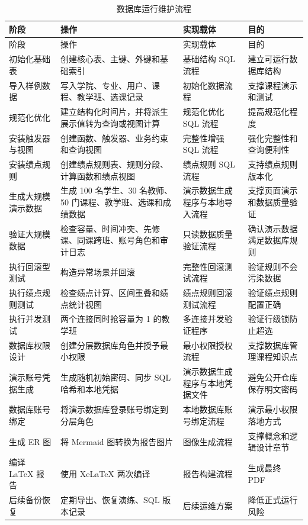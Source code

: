 {\footnotesize
\setlength{\tabcolsep}{3pt}
\renewcommand{\arraystretch}{1.16}
\begin{longtable}{p{}p{}p{}p{}}
\caption{数据库运行维护流程}\label{tab:operation-maintenance-flow}\\
\toprule
阶段 & 操作 & 实现载体 & 目的 \\
\midrule
\endfirsthead
\toprule
阶段 & 操作 & 实现载体 & 目的 \\
\midrule
\endhead
\bottomrule
\endfoot
初始化基础表 & 创建核心表、主键、外键和基础索引 & 基础结构 SQL 流程 & 建立可运行数据库结构 \\
导入样例数据 & 写入学院、专业、用户、课程、教学班、选课记录 & 初始化数据流程 & 支撑课程演示和测试 \\
规范化优化 & 建立结构化时间片，并将派生展示值转为查询或视图计算 & 规范化优化 SQL 流程 & 提高规范化程度 \\
安装触发器与视图 & 创建函数、触发器、业务约束和查询视图 & 完整性增强 SQL 流程 & 强化完整性和查询便利性 \\
安装绩点规则 & 创建绩点规则表、规则分段、计算函数和绩点视图 & 绩点规则 SQL 流程 & 支持绩点规则版本化 \\
生成大规模演示数据 & 生成 100 名学生、30 名教师、50 门课程、教学班、选课和成绩数据 & 演示数据生成程序与本地导入流程 & 支撑页面演示和数据质量验证 \\
验证大规模数据 & 检查容量、时间冲突、先修课、同课跨班、账号角色和审计日志 & 只读数据质量验证流程 & 确认演示数据满足数据库规则 \\
执行回滚型测试 & 构造异常场景并回滚 & 完整性回滚测试流程 & 验证规则不会污染数据 \\
执行绩点规则测试 & 检查绩点计算、区间重叠和绩点统计视图 & 绩点规则回滚测试流程 & 验证绩点规则配置正确 \\
执行并发测试 & 两个连接同时抢容量为 1 的教学班 & 多连接并发验证程序 & 验证行级锁防止超选 \\
数据库权限设计 & 创建分层数据库角色并授予最小权限 & 最小权限授权流程 & 支撑数据库管理课程知识点 \\
演示账号凭据生成 & 生成随机初始密码、同步 SQL 哈希和本地凭据 & 演示数据生成程序与本地凭据文件 & 避免公开仓库保存明文密码 \\
数据库账号绑定 & 将演示数据库登录账号绑定到分层角色 & 本地数据库账号绑定流程 & 演示最小权限落地方式 \\
生成 ER 图 & 将 Mermaid 图转换为报告图片 & 图像生成流程 & 支撑概念和逻辑设计章节 \\
编译 LaTeX 报告 & 使用 XeLaTeX 两次编译 & 报告构建流程 & 生成最终 PDF \\
后续备份恢复 & 定期导出、恢复演练、SQL 版本记录 & 后续运维方案 & 降低正式运行风险 \\
\end{longtable}
}

